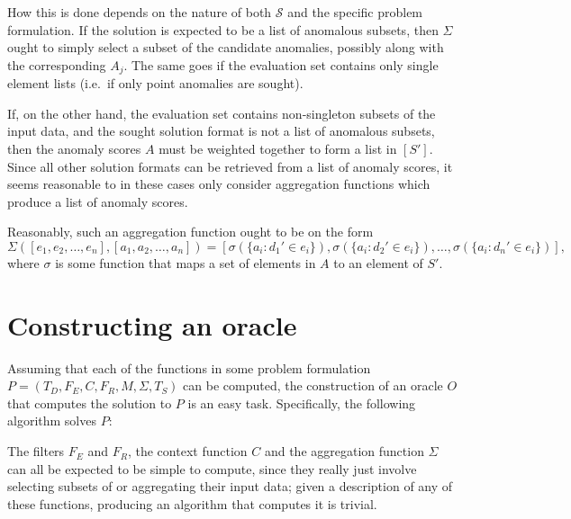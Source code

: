 How this is done depends on the nature of both $\mathcal{S}$ and the specific problem formulation. If the solution is expected to be a list of anomalous subsets, then $\Sigma$ ought to simply select a subset of the candidate anomalies, possibly along with the corresponding $A_j$. The same goes if the evaluation set contains only single element lists (i.e.\ if only point anomalies are sought).

If, on the other hand, the evaluation set contains non-singleton subsets of the input data, and the sought solution format is not a list of anomalous subsets, then the anomaly scores $A$ must be weighted together to form a list in $[S']$. Since all other solution formats can be retrieved from a list of anomaly scores, it seems reasonable to in these cases only consider aggregation functions which produce a list of anomaly scores.

Reasonably, such an aggregation function ought to be on the form
\[
    \Sigma([e_1, e_2, \dots, e_n], [a_1, a_2, \dots, a_n]) = [\sigma(\{a_i : d_1' \in e_i\}), \sigma(\{a_i : d_2' \in e_i\}), \dots, \sigma(\{a_i : d_n' \in e_i\})],
\]
where $\sigma$ is some function that maps a set of elements in $A$ to an element of $S'$.

\section{Constructing an oracle}

Assuming that each of the functions in some problem formulation $P = (T_D, F_E, C, F_R, M, \Sigma, T_S)$ can be computed, the construction of an oracle $O$ that computes the solution to $P$ is an easy task. Specifically, the following algorithm solves $P$:

\begin{algorithmic}
     
    \EndFor{}
\end{algorithmic}

The filters $F_E$ and $F_R$, the context function $C$ and the aggregation function $\Sigma$ can all be expected to be simple to compute, since they really just involve selecting subsets of or aggregating their input data; given a description of any of these functions, producing an algorithm that computes it is trivial.

